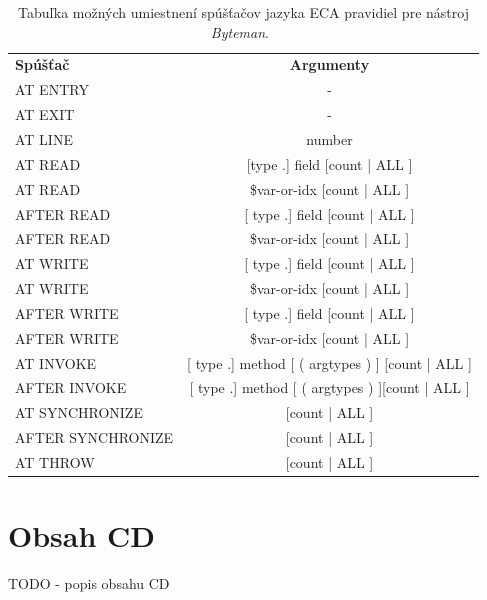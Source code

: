 \documentclass[11pt,final,oneside]{fithesis}
\newenvironment{example}[1]
{
\vspace{3mm}
\noindent\textbf{#1}
\vspace{2mm}
}
{
\vspace{3mm}
}
\begin{document}
\begin{table}
  \begin{tabular}{| l | c |}
    \hline
    \textbf{Spúšťač} & \textbf{Argumenty} \\
    \hhline{|=|=|}
    AT ENTRY & - \\ \hline
    AT EXIT & - \\ \hline
    AT LINE & number \\ \hline
    AT READ & [type .] field [count | ALL ] \\ \hline
    AT READ & \$var-or-idx [count | ALL ] \\ \hline
    AFTER READ & [ type .] field [count | ALL ] \\ \hline
    AFTER READ & \$var-or-idx [count | ALL ] \\ \hline
    AT WRITE & [ type .] field [count | ALL ] \\ \hline
    AT WRITE & \$var-or-idx [count | ALL ] \\ \hline
    AFTER WRITE & [ type .] field [count | ALL ] \\ \hline
    AFTER WRITE & \$var-or-idx [count | ALL ] \\ \hline
    AT INVOKE & [ type .] method [ ( argtypes ) ] [count | ALL ] \\ \hline
    AFTER INVOKE & [ type .] method [ ( argtypes ) ][count | ALL ] \\ \hline
    AT SYNCHRONIZE & [count | ALL ] \\ \hline
    AFTER SYNCHRONIZE & [count | ALL ] \\ \hline
    AT THROW & [count | ALL ] \\
    \hline
  \end{tabular}
  \caption{Tabuľka možných umiestnení spúšťačov jazyka ECA pravidiel pre
  nástroj \textit{Byteman}.~\cite{RedHat:Byteman}}
  \label{tab:tab6}
\end{table}

\chapter{Obsah CD}
TODO - popis obsahu CD

%
%
\end{document}
